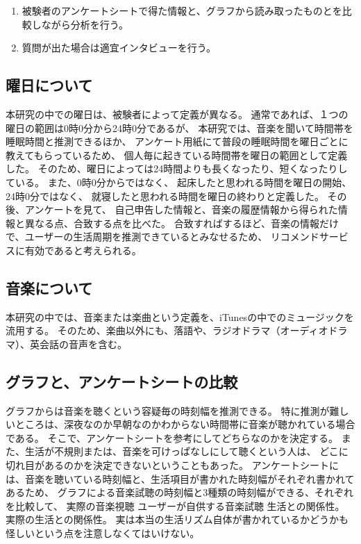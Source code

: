 \documentclass[11pt, twocolumn]{jsarticle}
\begin{document}
\begin{enumerate}
\item
被験者のアンケートシートで得た情報と、グラフから読み取ったものとを比較しながら分析を行う。
\item
質問が出た場合は適宜インタビューを行う。

\end{enumerate}


\subsection{曜日について}
本研究の中での曜日は、被験者によって定義が異なる。
通常であれば、１つの曜日の範囲は0時0分から24時0分であるが、
本研究では、音楽を聞いて時間帯を睡眠時間と推測できるほか、
アンケート用紙にて普段の睡眠時間を曜日ごとに教えてもらっているため、
個人毎に起きている時間帯を曜日の範囲として定義した。
そのため、曜日によっては24時間よりも長くなったり、短くなったりしている。
また、0時0分からではなく、
起床したと思われる時間を曜日の開始、24時0分ではなく、
就寝したと思われる時間を曜日の終わりと定義した。
その後、アンケートを見て、
自己申告した情報と、音楽の履歴情報から得られた情報と異なる点、合致する点を比べた。
合致すればするほど、音楽の情報だけで、ユーザーの生活周期を推測できているとみなせるため、
リコメンドサービスに有効であると考えられる。

\subsection{音楽について}
本研究の中では、音楽または楽曲という定義を、iTunesの中でのミュージックを流用する。
そのため、楽曲以外にも、落語や、ラジオドラマ（オーディオドラマ）、英会話の音声を含む。

\subsection{グラフと、アンケートシートの比較}
グラフからは音楽を聴くという容疑毎の時刻幅を推測できる。
特に推測が難しいところは、深夜なのか早朝なのかわからない時間帯に音楽が聴かれている場合である。
そこで、アンケートシートを参考にしてどちらなのかを決定する。
また、生活が不規則または、音楽を可けっぱなしにして聴くという人は、
どこに切れ目があるのかを決定できないということもあった。
アンケートシートには、音楽を聴いている時刻幅と、生活項目が書かれた時刻幅がそれぞれ書かれてあるため、
グラフによる音楽試聴の時刻幅と3種類の時刻幅ができる、それぞれを比較して、
実際の音楽視聴
ユーザーが自供する音楽試聴
生活との関係性。
実際の生活との関係性。
	実は本当の生活リズム自体が書かれているかどうかも怪しいという点を注意しなくてはいけない。
	
\end{document}
